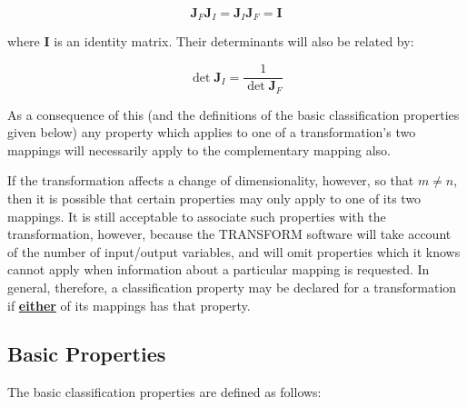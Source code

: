 \documentclass[twoside,11pt]{article}
\newcommand{\xlabel}[1]{}
\renewcommand{\_}{\texttt{\symbol{95}}}
\newcommand{\name}[1]{\mbox{\small{#1}}}
\begin{document}
\begin{equation}
\textbf{J}_F \textbf{J}_I = \textbf{J}_I \textbf{J}_F = \textbf{I}
\end{equation}

where $\textbf{I}$ is an identity matrix.
Their determinants will also be related by:

\begin{equation}
\det{\textbf{J}_I} = \frac{1}{\det{\textbf{J}_F}}
\end{equation}

As a consequence of this (and the definitions of the basic classification
properties given below) any property which applies to one of a
transformation's two mappings will necessarily apply to the complementary
mapping also.

If the transformation affects a change of dimensionality, however, so that
\mbox{$m \ne n$}, then it is possible that certain properties may only apply
to one of its two mappings.
It is still acceptable to associate such properties with the transformation,
however, because the \name{TRANSFORM} software will take account of the
number of input/output variables, and will omit properties which it knows
cannot apply when information about a particular mapping is requested.
In general, therefore, a classification property may be declared for a
transformation if \underline{\textbf{either}} of its mappings has that property.


\subsection{\xlabel{basic_properties}Basic Properties}

The basic classification properties are defined as follows:
\end{document}

